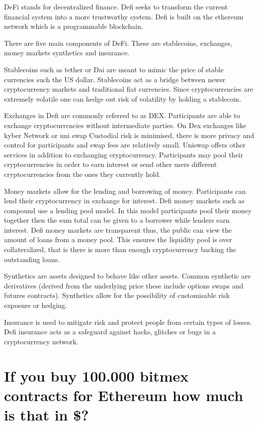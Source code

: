 DeFi stands for decentralized finance. Defi seeks to transform the current financial system into a more trustworthy system. Defi is built on the ethereum network which is a programmable blockchain. 

There are five main components of DeFi. These are stablecoins, exchanges, money markets synthetics and insurance. 

Stablecoins such as tether or Dai are meant to mimic the price of stable currencies such the US dollar.  Stablecoins act as a bridge between newer cryptocurrency markets and traditional fiat currencies. Since cryptocurrencies are extremely volatile one can hedge out risk of volatility by holding a stablecoin.


Exchanges in Defi are commonly referred to as DEX. Participants are able to exchange cryptocurrencies without intermediate parties. On Dex exchanges like kyber Network or uni swap  Custodial risk is minimised, there is more privacy and control for participants and swap fees are relatively small. Uniswap offers other services in addition to exchanging cryptocurrency. Participants may pool their cryptocurrencies in order to earn interest or send other users different cryptocurrencies from the ones they currently hold.

Money markets allow for the lending and borrowing of money. Participants can lend their cryptocurrency in exchange for interest. Defi money markets such as compound use a lending pool model.   In this model participants pool their money together then the sum total can be given to a borrower while lenders earn interest. Defi money markets are transparent thus, the public can view the amount of loans from a money pool. This ensures the liquidity pool is over collateralized, that is there is more than enough cryptocurrency backing the outstanding loans. 

Synthetics are assets designed to behave like other assets. Common synthetic are derivatives (derived from the underlying price these include options swaps and futures contracts).  Synthetics allow for the possibility of customisable risk exposure or hedging. 

Insurance is used to mitigate risk and protect people from certain types of losses. Defi insurance acts as a safeguard against hacks, glitches or bugs in a cryptocurrency network.

\section{ If you buy 100.000 bitmex contracts for Ethereum how much is that in \$?}

